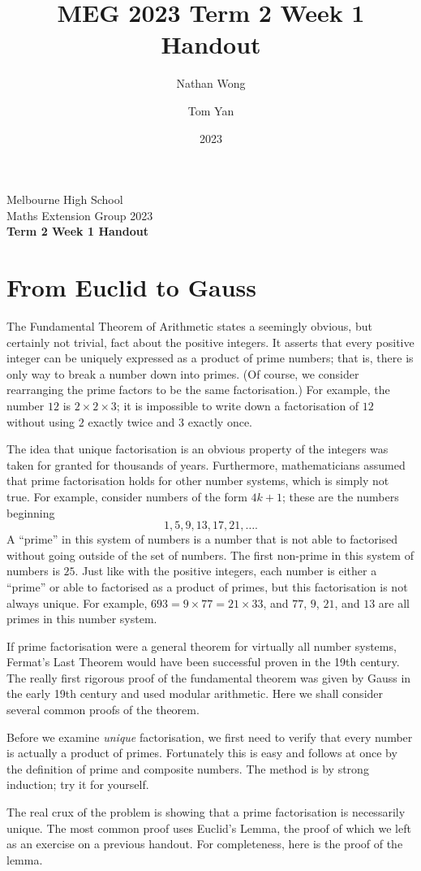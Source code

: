 \documentclass[a4paper,10pt]{article}
\title{MEG 2023 Term 2 Week 1 Handout}
\author{Nathan Wong\and Tom Yan}
\date{2023}
\newcommand{\thetitle}{Term 2 Week 1 Handout}
\begin{document}
\noindent Melbourne High School\\
Maths Extension Group 2023\\
\textbf{\thetitle}\\
\twocolumn
\section{From Euclid to Gauss}
The Fundamental Theorem of Arithmetic states a seemingly obvious, but certainly not trivial, fact about
the positive integers. It asserts that every positive integer can be uniquely expressed as a product of
prime numbers; that is, there is only way to break a number down into primes. (Of course, we consider
rearranging the prime factors to be the same factorisation.) For example, the
number \(12\) is \(2\times2\times3\); it is impossible to write down a factorisation of \(12\) without
using \(2\) exactly twice and \(3\) exactly once.

The idea that unique factorisation is an obvious property of the integers was taken for granted for
thousands of years. Furthermore, mathematicians assumed that prime factorisation holds for other
number systems, which is simply not true. For example, consider numbers of the form
\(4k+1\); these are the numbers beginning \[1,5,9,13,17,21,\ldots.\] A ``prime'' in this system
of numbers is a number that is not able to factorised without going outside of the set of numbers.
The first non-prime in this system of numbers is \(25\). Just like with the positive integers, each
number is either a ``prime'' or able to factorised as a product of primes, but this factorisation
is not always unique. For example, \(693=9\times77=21\times33\), and \(77\), \(9\), \(21\), and \(13\)
are all primes in this number system.

If prime factorisation were a general theorem for virtually
all number systems, Fermat's Last Theorem would have been successful proven in the 19th century.
The really first rigorous proof of the fundamental theorem was given by Gauss in the early 19th century and
used modular arithmetic. Here we shall consider several common proofs of the theorem.

Before we examine \emph{unique} factorisation, we first need to verify that every number is actually
a product of primes. Fortunately this is easy and follows at once by the definition of prime and composite numbers.
The method is by strong induction; try it for yourself.

The real crux of the problem is showing that a prime factorisation is necessarily unique. The most
common proof uses Euclid's Lemma, the proof of which we left as an exercise on a previous handout.
For completeness, here is the proof of the lemma.
\end{document}
